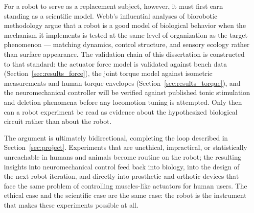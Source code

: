 For a robot to serve as a replacement subject, however, it must first earn
standing as a scientific model. Webb's influential analyses of biorobotic
methodology \citep{webb_robots_2001, webb_robots_2002} argue that a robot is a
good model of biological behavior when the mechanism it implements is tested at
the same level of organization as the target phenomenon --- matching dynamics,
control structure, and sensory ecology rather than surface appearance. The
validation chain of this dissertation is constructed to that standard: the
actuator force model is validated against bench data
(Section~\ref{sec:results_force}), the joint torque model against isometric
measurements and human torque envelopes (Section~\ref{sec:results_torque}), and
the neuromechanical controller will be verified against published tonic
stimulation and deletion phenomena \citep{selionov_tonic_2009,
rybak_modelling_2006} before any locomotion tuning is attempted. Only then can a
robot experiment be read as evidence about the hypothesized biological circuit
rather than about the robot.

The argument is ultimately bidirectional, completing the loop described in
Section~\ref{sec:project}. Experiments that are unethical, impractical, or
statistically unreachable in humans and animals become routine on the robot; the
resulting insights into neuromechanical control feed back into biology, into the
design of the next robot iteration, and directly into prosthetic and orthotic
devices that face the same problem of controlling muscles-like actuators for
human users. The ethical case and the scientific case are the same case: the
robot is the instrument that makes these experiments possible at all.
